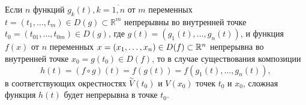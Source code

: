 \begin{theorem}
	Если $n$ функций $g_k(t), k = \overline{1, n}$ от $m$ переменных $t = (t_1, \ldots, t_m) \in D(g) \subset \mathbb{R}^m$ непрерывны во внутренней точке ${t_0 = (t_{01}, \ldots, t_{0m}) \in D(g)}$, где
	$g(t) = (g_1(t), \ldots, g_n(t))$, и функция $ f(x) $ от $n$ переменных ${x = (x_1, \ldots , x_n) \in D(f) \subset \mathbb{R}^n}$ непрерывна во внутренней точке $x_0 = g(t_0) \in D(f)$, то в случае существования
	композиции
	\begin{equation}
		\label{eq:2-fg-composition}
		h(t) = (f \circ g)(t) = f(g(t)) = f(g_1(t), \ldots, g_n(t)),
	\end{equation}
	в соответствующих окрестностях $ \overset{ \sim }{V} (t_0) $ и $ V (x_0) $ точек $t_0$ и $x_0$, сложная функция $h(t)$ будет непрерывна в точке $t_0$.
\end{theorem}
